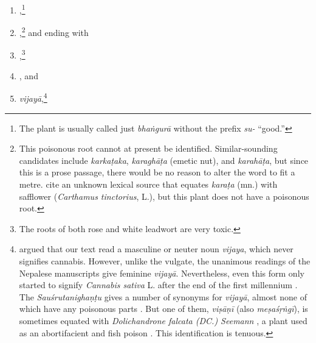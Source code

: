 \begin{translation}
\begin{itemize}
\begin{enumerate}
        \item {},\footnote{The plant is
usually called just \emph{bhaṅgurā} without the prefix \emph{su-} “good.”}
        

        \item {},\footnote{This poisonous root cannot at present
be identified.  Similar-sounding candidates include \emph{karkaṭaka},
\emph{karaghāṭa} (emetic nut), and \emph{karahāṭa}, but since this is a
prose passage, there would be no reason to alter the word to fit a metre.
\citet[255]{moni-sans} cite an unknown lexical source that equates
\emph{karaṭa} (mn.) with safflower (\emph{Carthamus tinctorius}, L.), but
this plant does not have a poisonous root.} %
%
%
%
%
and ending with \item {},\footnote{The roots of both rose and white leadwort are very toxic.} 

\item
{}, and 

\item
\emph{vijayā},\footnote{\citet[61, n.\,3]{meul-sear} argued that our text read a
masculine or neuter noun \emph{vijaya}, which never signifies cannabis.  
However,
unlike the vulgate, the unanimous readings of the Nepalese manuscripts give
feminine \emph{vijayā}.  Nevertheless, even this form only started to signify
\emph{Cannabis sativa} L. after the end of the first millennium
\citep{meul-sear,wuja-cann,mchu-2021a}. The \emph{Sauśrutanighaṇṭu} 
gives a number of synonyms for \emph{vijayā}, almost none 
of
which have any poisonous parts \citep[5.77,
10.143]{suve-2000}.  But one of them, \emph{viṣāṇī} (also
\emph{meṣaśṛṅgī}), is sometimes equated with \emph{Dolichandrone falcata 
(DC.)
Seemann} \citep[518]{adps}, a plant used as an abortifacient and fish poison
\citep[\#862]{nadk-1982}.  This identification is tenuous.}
%
%        
        \end{enumerate}
        \end{itemize}
    

\end{translation}
